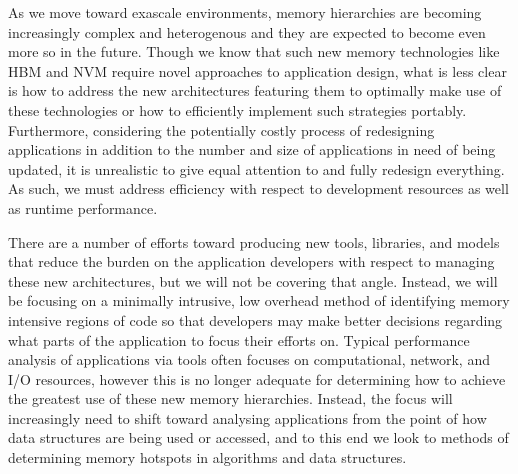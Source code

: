 As we move toward exascale environments, memory hierarchies are becoming increasingly complex and heterogenous and they are expected to become even more so in the future.
Though we know that such new memory technologies like \ac{HBM} and \ac{NVM} require novel approaches to application design, what is less clear is how to address the new architectures featuring them to optimally make use of these technologies or how to efficiently implement such strategies portably.
Furthermore, considering the potentially costly process of redesigning applications in addition to the number and size of applications in need of being updated, it is unrealistic to give equal attention to and fully redesign everything.
As such, we must address efficiency with respect to development resources as well as runtime performance.

There are a number of efforts toward producing new tools, libraries, and models that reduce the burden on the application developers with respect to managing these new architectures, but we will not be covering that angle.
Instead, we will be focusing on a minimally intrusive, low overhead method of identifying memory intensive regions of code so that developers may make better decisions regarding what parts of the application to focus their efforts on.
Typical performance analysis of applications via tools often focuses on computational, network, and I/O resources, however this is no longer adequate for determining how to achieve the greatest use of these new memory hierarchies.
Instead, the focus will increasingly need to shift toward analysing applications from the point of how data structures are being used or accessed, and to this end we look to methods of determining memory hotspots in algorithms and data structures.

